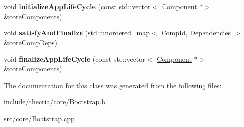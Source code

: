 \begin{DoxyCompactItemize}
\item 
\mbox{\label{classtheoria_1_1core_1_1Bootstrap_a3a133cd93cbe09ba4799d2a72bc9fde6}} 
void {\bfseries initialize\+App\+Life\+Cycle} (const std\+::vector$<$ \hyperlink{classtheoria_1_1core_1_1Component}{Component} $\ast$$>$ \&core\+Components)
\item 
\mbox{\label{classtheoria_1_1core_1_1Bootstrap_a863bc8162f5e60cd6520f81b8809b9c1}} 
void {\bfseries satisfy\+And\+Finalize} (std\+::unordered\+\_\+map$<$ Comp\+Id, \hyperlink{classtheoria_1_1core_1_1Dependencies}{Dependencies} $>$ \&core\+Comp\+Deps)
\item 
\mbox{\label{classtheoria_1_1core_1_1Bootstrap_a4a41a82a056bb7143fc7ff0f4df8c01d}} 
void {\bfseries finalize\+App\+Life\+Cycle} (const std\+::vector$<$ \hyperlink{classtheoria_1_1core_1_1Component}{Component} $\ast$$>$ \&core\+Components)
\end{DoxyCompactItemize}


The documentation for this class was generated from the following files\+:\begin{DoxyCompactItemize}
\item 
include/theoria/core/Bootstrap.\+h\item 
src/core/Bootstrap.\+cpp\end{DoxyCompactItemize}
